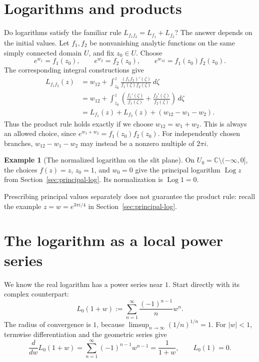\documentclass[11pt]{article}
\theoremstyle{plain}
\theoremstyle{definition}
\newtheorem{example}[theorem]{Example}
\theoremstyle{remark}
\numberwithin{equation}{section}
\newcommand{\C}{\mathbb{C}}
\DeclareMathOperator{\Log}{Log}
\newenvironment{lecturefigure}
 {\par\addvspace{0.25em}\begingroup\setlength{\parskip}{0pt}\centering}
 {\par\endgroup\addvspace{0.25em}}
\begin{document}
\section{Logarithms and products}
Do logarithms satisfy the familiar rule
$L_{f_1f_2}=L_{f_1}+L_{f_2}$? The answer depends on the initial values.
Let $f_1,f_2$ be nonvanishing analytic functions on the same simply
connected domain $U$, and fix $z_0\in U$. Choose
\[
 e^{w_1}=f_1(z_0),\qquad e^{w_2}=f_2(z_0),\qquad
 e^{w_{12}}=f_1(z_0)f_2(z_0).
\]
The corresponding integral constructions give
\begin{align*}
 L_{f_1f_2}(z)
 &=w_{12}+\int_{z_0}^z\frac{(f_1f_2)'(\zeta)}{f_1(\zeta)f_2(\zeta)}\,d\zeta\\
 &=w_{12}+\int_{z_0}^z\left(\frac{f_1'(\zeta)}{f_1(\zeta)}
                     +\frac{f_2'(\zeta)}{f_2(\zeta)}\right)\,d\zeta\\
 &=L_{f_1}(z)+L_{f_2}(z)+(w_{12}-w_1-w_2).
\end{align*}
Thus the product rule holds exactly if we choose
$w_{12}=w_1+w_2$. This is always an allowed choice, since
$e^{w_1+w_2}=f_1(z_0)f_2(z_0)$. For independently chosen branches,
$w_{12}-w_1-w_2$ may instead be a nonzero multiple of $2\pi i$.

\begin{example}[The normalized logarithm on the slit plane]
On $U_0=\C\setminus(-\infty,0]$, the choices $f(z)=z$, $z_0=1$,
and $w_0=0$ give the principal logarithm $\Log z$ from Section~\ref{sec:principal-log}.
Its normalization is $\Log 1=0$.
\begin{lecturefigure}
\end{lecturefigure}
Prescribing principal values separately does not guarantee the product
rule: recall the example $z=w=e^{3\pi i/4}$ in Section~\ref{sec:principal-log}.
\end{example}

\section{The logarithm as a local power series}
We know the real logarithm has a power series near $1$. Start directly
with its complex counterpart:
\[
 L_0(1+w):=\sum_{n=1}^{\infty}\frac{(-1)^{n-1}}{n}w^n.
\]
The radius of convergence is $1$, because
$\limsup_{n\to\infty}(1/n)^{1/n}=1$. For $|w|<1$, termwise
differentiation and the geometric series give
\[
 \frac{d}{dw}L_0(1+w)=\sum_{n=1}^{\infty}(-1)^{n-1}w^{n-1}
 =\frac{1}{1+w},\qquad L_0(1)=0.
\]
\end{document}
